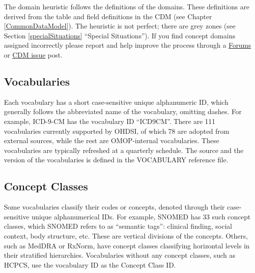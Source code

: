 \documentclass[11pt]{book}
\theoremstyle{definition}
\theoremstyle{definition}
\theoremstyle{definition}
\theoremstyle{remark}
\begin{document}
The domain heuristic follows the definitions of the domains. These
definitions are derived from the table and field definitions in the CDM
(see Chapter \ref{CommonDataModel}). The heuristic is not perfect; there
are grey zones (see Section \ref{specialSituations} ``Special
Situations''). If you find concept domains assigned incorrectly please
report and help improve the process through a
\href{https://forums.ohdsi.org}{Forums} or
\href{https://github.com/OHDSI/CommonDataModel/issues}{CDM issue} post.

\subsection{Vocabularies}\label{vocabularies}

Each vocabulary has a short case-sensitive unique alphanumeric ID, which
generally follows the abbreviated name of the vocabulary, omitting
dashes. For example, ICD-9-CM has the vocabulary ID ``ICD9CM''. There
are 111 vocabularies currently supported by OHDSI, of which 78 are
adopted from external sources, while the rest are OMOP-internal
vocabularies. These vocabularies are typically refreshed at a quarterly
schedule. The source and the version of the vocabularies is defined in
the VOCABULARY reference file. 

\subsection{Concept Classes}\label{concept-classes}

Some vocabularies classify their codes or concepts, denoted through
their case-sensitive unique alphanumerical IDs. For example, SNOMED has
33 such concept classes, which SNOMED refers to as ``semantic tags'':
clinical finding, social context, body structure, etc. These are
vertical divisions of the concepts. Others, such as MedDRA or RxNorm,
have concept classes classifying horizontal levels in their stratified
hierarchies. Vocabularies without any concept classes, such as HCPCS,
use the vocabulary ID as the Concept Class ID. 
\end{document}
